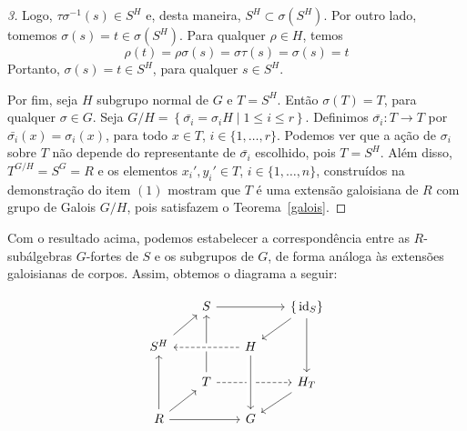 \begin{teo}
\begin{proof}[3]
Logo, $\tau\sigma^{-1}(s) \in S^H$ e, desta maneira, $S^H \subset \sigma(S^H)$. Por outro lado, tomemos $\sigma(s)=t \in \sigma(S^H)$. Para qualquer $\rho \in H$, temos\[\rho(t)=\rho\sigma(s)=\sigma\tau(s)=\sigma(s)=t\]
Portanto, $\sigma(s)=t \in S^H$, para qualquer $s \in S^H$. \par 
Por fim, seja $H$ subgrupo normal de $G$ e $T=S^H$. Então $\sigma(T)=T$, para qualquer $\sigma\in G$. Seja $G/H=\left\{ \bar{\sigma_i} = \sigma_i H \mid 1\leq i \leq r \right\}$. Definimos $\bar{\sigma_i}: T\rightarrow T$ por $\bar{\sigma_i}(x) =\sigma_i(x)$, para todo $x \in T$, $i\in \{1,\dots, r\}$. Podemos ver que a ação de $\sigma_i$ sobre $T$ não depende do representante de $\bar{\sigma_i}$ escolhido, pois $T=S^H$. Além disso, $T^{G/H}=S^G=R$ e os elementos $x_i',y_i' \in T$, $i \in \{1,\dots,n\}$, construídos na demonstração do item $(1)$ mostram que $T$ é uma extensão galoisiana de $R$ com grupo de Galois $G/H$, pois satisfazem o Teorema~\ref{galois}.
\end{proof}
\end{teo}
Com o resultado acima, podemos estabelecer a correspondência entre as $R$-subálgebras $G$-fortes de $S$ e os subgrupos de $G$, de forma análoga às extensões galoisianas de corpos. Assim, obtemos o diagrama a seguir:

\[\begin{tikzcd}[row sep=scriptsize, column sep=scriptsize]
& S \arrow[leftarrow]{dl}\arrow{rr}\arrow[leftarrow]{dd} & & \{\id{S}\} \arrow{dl}\arrow{dd} \\
S^H \arrow[crossing over, leftarrow, dashed]{rr}\arrow[leftarrow]{dd} & & H \\
& T \arrow[leftarrow]{dl}\arrow[dashed]{rr} & & H_T \arrow{dl} \\
R \arrow{rr} & & G\arrow[crossing over, leftarrow]{uu} \\
\end{tikzcd}\]

